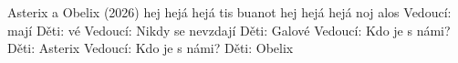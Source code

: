 \begin{TEXT}{Asterix a Obelix (2026)}
\SLOKA* {} hej hejá hejá\NL
{}tis buanot \NL
{} hej hejá hejá\NL
{}noj alos
\SLOKA* Vedoucí:   mají\NL
Děti: vé\NL
Vedoucí: Nikdy se nevzdají\NL
Děti: Galové\NL
Vedoucí: Kdo je s námi?\NL
Děti: Asterix\NL
Vedoucí: Kdo je s námi?\NL
Děti: Obelix
\end{TEXT}


